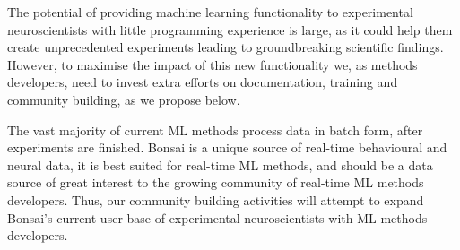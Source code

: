 
The potential of providing machine learning functionality to experimental
neuroscientists with little programming experience is large, as it could help
them create unprecedented experiments leading to groundbreaking scientific
findings.
%
However, to maximise the impact of this new functionality we, as methods
developers, need to invest extra efforts on documentation, training and
community building, as we propose below.

The vast majority of current ML methods process data in batch form, after
experiments are finished. Bonsai is a unique source of real-time behavioural and
neural data, it is best suited for real-time ML methods, and should be a data
source of great interest to the growing community of real-time ML methods
developers. Thus, our community building activities will attempt to expand
Bonsai's current user base of experimental neuroscientists with ML methods
developers.

